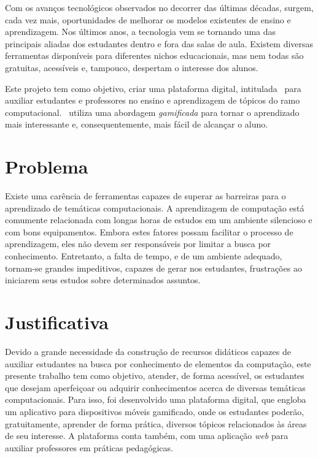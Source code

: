 Com os avanços tecnológicos observados no decorrer das últimas décadas, surgem, cada vez mais, oportunidades de melhorar os modelos existentes de ensino e aprendizagem. Nos últimos anos, a tecnologia vem se tornando uma das principais aliadas dos estudantes dentro e fora das salas de aula. Existem diversas ferramentas disponíveis para diferentes nichos educacionais, mas nem todas são gratuitas, acessíveis e, tampouco, despertam o interesse dos alunos.

Este projeto tem como objetivo, criar uma plataforma digital, intitulada \appName\, para auxiliar estudantes e professores no ensino e aprendizagem de tópicos do ramo computacional. \appName\ utiliza uma abordagem \textit{gamificada} \cite{gamification_motivates} para tornar o aprendizado mais interessante e, consequentemente, mais fácil de alcançar o aluno.

\section{Problema}

Existe uma carência de ferramentas capazes de superar as barreiras para o aprendizado de temáticas computacionais. A aprendizagem de computação está comumente relacionada com longas horas de estudos em um ambiente silencioso e com bons equipamentos. Embora estes fatores possam facilitar o processo de aprendizagem, eles não devem ser responsáveis por limitar a busca por conhecimento. Entretanto, a falta de tempo, e de um ambiente adequado, tornam-se grandes impeditivos, capazes de gerar nos estudantes, frustrações ao iniciarem seus estudos sobre determinados assuntos.

\section{Justificativa}
Devido a grande necessidade da construção de recursos didáticos capazes de auxiliar estudantes na busca por conhecimento de elementos da computação, este presente trabalho tem como objetivo, atender, de forma acessível, os estudantes que desejam aperfeiçoar ou adquirir conhecimentos acerca de diversas temáticas computacionais. Para isso, foi desenvolvido uma plataforma digital, que engloba um aplicativo para dispositivos móveis gamificado, onde os estudantes poderão, gratuitamente, aprender de forma prática, diversos tópicos relacionados às áreas de seu interesse. A plataforma conta também, com uma aplicação \textit{web} para auxiliar professores em práticas pedagógicas.


